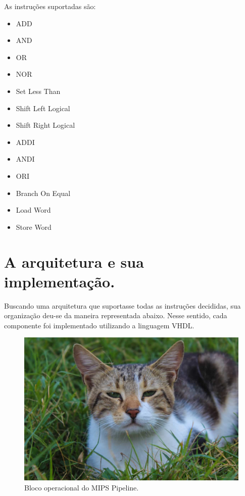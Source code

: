\documentclass[a4paper, 11pt]{article}
\begin{document}
As instruções suportadas são:
\begin{multicols}{3}
    \begin{itemize}
        \item ADD
        \item AND
        \item OR 
        \item NOR
        \item Set Less Than
    \end{itemize}
    \columnbreak
    \begin{itemize}
        \item Shift Left Logical
        \item Shift Right Logical
        \item ADDI
        \item ANDI
    \end{itemize}
    \columnbreak
    \begin{itemize}
        \item ORI
        \item Branch On Equal
        \item Load Word
        \item Store Word
    \end{itemize}
\raggedcolumns
\end{multicols}

\section{A arquitetura e sua implementação.}
Buscando uma arquitetura que suportasse todas as instruções decididas, sua organização
deu-se da maneira representada abaixo. Nesse sentido, cada componente foi implementado
utilizando a linguagem VHDL.

\begin{figure}[h!]
    \centering
    \includegraphics[width=.7\linewidth]{placeholder.jpg}
    \caption{Bloco operacional do MIPS Pipeline.}
\end{figure}
\end{document}
